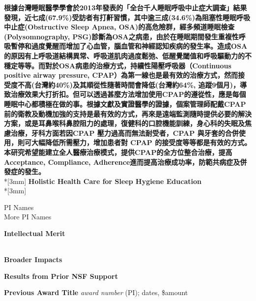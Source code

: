 \documentclass{proposalnsf}
\begin{document}
\begin{center}
{\Large{\bf 根據台灣睡眠醫學學會於2013年發表的「全台千人睡眠呼吸中止症大調查」結果發現，近七成(67.9\%)受訪者有打鼾習慣，其中逾三成(34.6\%)為阻塞性睡眠呼吸中止症(Obstructive Sleep Apnea, OSA)的高危險群，經多頻道睡眠檢查(Polysomnography, PSG)診斷為OSA之病患，由於在睡眠期間發生重複性呼吸暫停和過度覺醒而增加了心血管，腦血管和神經認知疾病的發生率。造成OSA的原因有上呼吸道結構異常、呼吸道肌肉過度鬆弛、低醒覺閾值和呼吸驅動力的不穩定等等。而對於OSA病患的治療方式，持續性陽壓呼吸器（Continuous positive airway pressure, CPAP）為第一線也是最有效的治療方式，然而接受度不高(台灣約40\%)及其順從性隨著時間會降低(台灣約64\%, 追蹤9個月)，導致治療效果大打折扣。但可以透過甚麼方法增加使用CPAP的遵從性，應是每個睡眠中心都積極在做的事。根據文獻及實證醫學的證據，個案管理師配戴CPAP前的衛教及動機加強的支持是最有效的方式，再來是遠端監測隨時提供必要的解決方案，或是耳鼻喉科鼻腔阻力的處理，復健科的口腔機能訓練，身心科的失眠及焦慮治療，牙科方面若因CPAP 壓力過高而無法耐受者，CPAP 與牙套的合併使用，則可大幅降低所需壓力，增加患者對 CPAP 的接受度等等都是有效的方式。本研究希望能建立全人醫療治療模式，提供CPAP的全方位整合治療，提高Acceptance, Compliance, Adherence進而提高治療成功率，防範共病症及併發症的發生。}}\\*[3mm]
{\bf Holistic Health Care for Sleep Hygiene Education} \\*[3mm]

PI Names \\
More PI Names

\end{center}





\noindent
{\bf Intellectual Merit}

\ \\

\noindent
{\bf Broader Impacts}

\renewcommand{\thepage} {B--\arabic{page}}

\newpage


\renewcommand{\thepage} {D--\arabic{page}}

\newpage

\centerline{\bf Results from Prior NSF Support}

\noindent
{\bf Previous Award Title}
{\it award number} (PI); dates, \$amount
\end{document}

